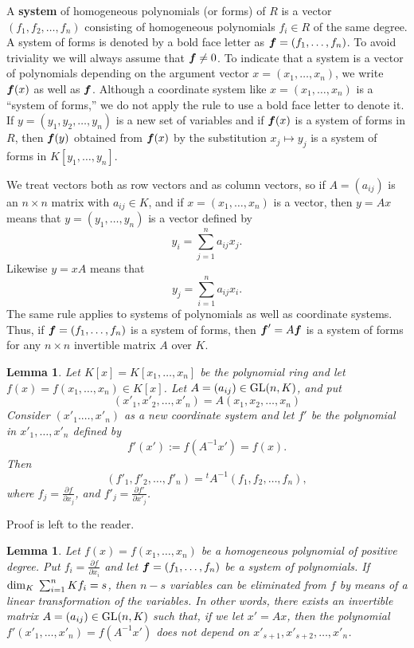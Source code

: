 \documentclass[12pt]{article}
\newtheorem{lemma}[theorem]{Lemma}
\theoremstyle{definition}
\theoremstyle{remark}
\def\dim{{\rm dim}}
\def\boldf{\mbox{\boldmath $f$}}
\def\GL{{\rm GL}}
\def\pa{\partial}
\begin{document}
A {\bf system} of homogeneous polynomials (or forms) of $R$ is a vector 
$(f_1, f_2, \ldots, f_n)$ consisting 
of homogeneous polynomials $f_i \in R$ of the same degree.  A system of  forms is denoted by 
a bold face letter as $\boldf=(f_1, \ldots, f_n)$.    
To avoid triviality we will always assume that $\boldf \neq 0$. 
To indicate that a system is a vector of 
polynomials depending on the argument vector $x=(x_1, \ldots, x_n)$, we write 
$\boldf(x)$ as well as $\boldf$. 
Although a coordinate system like  $x=(x_1, \ldots, x_n)$ is a ``system of forms,''  
we do not apply the rule to use  a bold face letter to denote it. 
If $y=(y_1, y_2, \ldots, y_n)$ is a  new set of variables  and if $\boldf(x)$ is a 
system of forms in $R$, then $\boldf(y)$ obtained from $\boldf(x)$ by the 
substitution  $x_j \mapsto y_j$   
is a system of forms in $K[y_1, \ldots, y_n]$. 

We treat vectors both as  row vectors and as  column vectors, 
so if $A=(a_{ij})$ is an $n \times n$ matrix with $a_{ij} \in K$,  and if 
$x=(x_1, \ldots, x_n)$ is a vector, then 
$y=Ax$  means  that 
$y=(y_1, \ldots, y_n)$ is a vector
defined by 
\[y_i = \sum _{j=1}^n a_{ij}x_j.\]
Likewise $y=xA$ means that 
\[y_j = \sum _{i=1}^na_{ij}x_i. \]
The same rule applies to systems of polynomials  as well as coordinate systems. 
Thus, if  $\boldf = (f_1, \ldots, f_n)$ is a system of forms, then 
$\boldf '= A\boldf$ 
is a system of forms for any  $n \times n$ invertible  matrix $A$ over $K$. 

\begin{lemma} \label{basic_001}  %
Let $K[x]=K[x_1, \ldots, x_n]$ be the polynomial ring and let $f(x)=f(x_1, \ldots, x_n) \in K[x]$. 
Let $A=(a_{ij}) \in \GL(n,K)$, and put 
\[(x'_1 ,x'_2, \ldots, x'_n)=A(x_1, x_2 , \ldots , x_n )
\]
Consider $(x'_1. \ldots, x'_n)$ as a new coordinate system and  
let $f'$ be the polynomial in $x'_1, \ldots, x'_n$  defined by 
\[f'(x'):=f(A^{-1}x')=f(x).\]
Then 
\[(f'_1, f'_2,  \ldots , f'_n)={}^tA^{-1}(f_1, f_2,  \ldots, f_n),\]
where $f_j = \frac{\pa f}{\pa x_j}$, and $f'_j = \frac{\pa f'}{\pa x'_j}$. 
\end{lemma}   

Proof is left to the reader. 

\begin{lemma}  \label{num_of_var_involved_1}     %
Let $f(x)=f(x_1, \ldots, x_n)$ be a homogeneous polynomial of positive degree. 
Put  $f_i = \frac{\pa f}{\pa x_i}$ and  let 
$\mbox{\boldmath $f$} = (f_1, \ldots, f_n)$ be  a system of polynomials. 
If $\dim _K \; \sum _{i=1} ^n Kf_i=s$, then 
$n-s$ variables can be eliminated from $f$ by means of a linear transformation of the 
variables.  In other words, 
there exists an invertible matrix 
$A=(a_{ij}) \in \GL(n,K)$ such that,  if we let 
$x'=Ax$, then  the polynomial 
$f'(x'_1, \ldots,x'_n )=f(A^{-1}x')$ does not depend on $x'_{s+1}, x'_{s+2}, \ldots, x'_{n}$.  
\end{lemma}   
\end{document}
